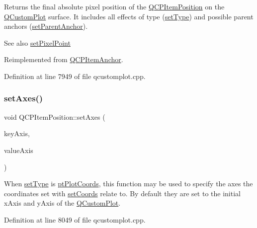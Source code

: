 Returns the final absolute pixel position of the \hyperlink{class_q_c_p_item_position}{Q\+C\+P\+Item\+Position} on the \hyperlink{class_q_custom_plot}{Q\+Custom\+Plot} surface. It includes all effects of type (\hyperlink{class_q_c_p_item_position_aa476abf71ed8fa4c537457ebb1a754ad}{set\+Type}) and possible parent anchors (\hyperlink{class_q_c_p_item_position_ac094d67a95d2dceafa0d50b9db3a7e51}{set\+Parent\+Anchor}).

\begin{DoxySeeAlso}{See also}
\hyperlink{class_q_c_p_item_position_ab404e56d9ac2ac2df0382c57933a71ef}{set\+Pixel\+Point} 
\end{DoxySeeAlso}


Reimplemented from \hyperlink{class_q_c_p_item_anchor_ae1a21d9471d1d788624cad297e1b8d6f}{Q\+C\+P\+Item\+Anchor}.



Definition at line 7949 of file qcustomplot.\+cpp.

\mbox{\label{class_q_c_p_item_position_a2185f45c75ac8cb9be89daeaaad50e37}} 
\subsubsection{\texorpdfstring{set\+Axes()}{setAxes()}}
{\footnotesize\ttfamily void Q\+C\+P\+Item\+Position\+::set\+Axes (\begin{DoxyParamCaption}\item[{\hyperlink{class_q_c_p_axis}{Q\+C\+P\+Axis} $\ast$}]{key\+Axis,  }\item[{\hyperlink{class_q_c_p_axis}{Q\+C\+P\+Axis} $\ast$}]{value\+Axis }\end{DoxyParamCaption})}

When \hyperlink{class_q_c_p_item_position_aa476abf71ed8fa4c537457ebb1a754ad}{set\+Type} is \hyperlink{class_q_c_p_item_position_aad9936c22bf43e3d358552f6e86dbdc8ad5ffb8dc99ad73263f7010c77342294c}{pt\+Plot\+Coords}, this function may be used to specify the axes the coordinates set with \hyperlink{class_q_c_p_item_position_aa988ba4e87ab684c9021017dcaba945f}{set\+Coords} relate to. By default they are set to the initial x\+Axis and y\+Axis of the \hyperlink{class_q_custom_plot}{Q\+Custom\+Plot}. 

Definition at line 8049 of file qcustomplot.\+cpp.

